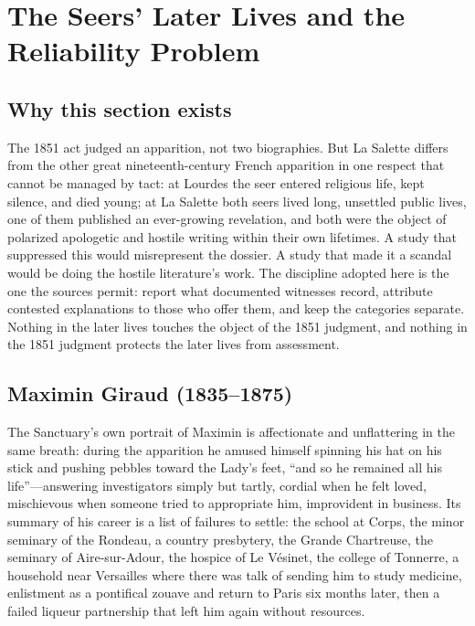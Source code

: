 \section{The Seers' Later Lives and the Reliability Problem}

\subsection{Why this section exists}

The 1851 act judged an apparition, not two biographies. But La
Salette differs from the other great nineteenth-century French
apparition in one respect that cannot be managed by tact: at Lourdes
the seer entered religious life, kept silence, and died young; at La
Salette both seers lived long, unsettled public lives, one of them
published an ever-growing revelation, and both were the object of
polarized apologetic and hostile writing within their own lifetimes.
A study that suppressed this would misrepresent the dossier. A study
that made it a scandal would be doing the hostile literature's work.
The discipline adopted here is the one the sources permit: report
what documented witnesses record, attribute contested explanations
to those who offer them, and keep the categories separate. Nothing
in the later lives touches the object of the 1851 judgment, and
nothing in the 1851 judgment protects the later lives from
assessment.

\subsection{Maximin Giraud (1835--1875)}

The Sanctuary's own portrait of Maximin is affectionate and
unflattering in the same breath: during the apparition he amused
himself spinning his hat on his stick and pushing pebbles toward the
Lady's feet, ``and so he remained all his life''---answering
investigators simply but tartly, cordial when he felt loved,
mischievous when someone tried to appropriate him, improvident in
business. Its summary of his career is a list of failures to settle:
the school at Corps, the minor seminary of the Rondeau, a country
presbytery, the Grande Chartreuse, the seminary of Aire-sur-Adour,
the hospice of Le Vésinet, the college of Tonnerre, a household near
Versailles where there was talk of sending him to study medicine,
enlistment as a pontifical zouave and return to Paris six months
later, then a failed liqueur partnership that left him again without
resources.

